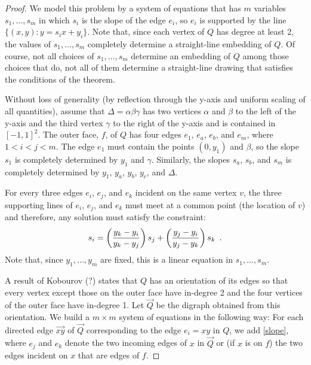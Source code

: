\documentclass{patmorin}
\begin{document}
\begin{proof}
   We model this problem by a system of equations that has $m$
   variables $s_1,\ldots,s_m$ in which $s_i$ is the slope of the edge
   $e_i$, so $e_i$ is supported by the line $\{(x,y):y=s_ix + y_i\}$.
   Note that, since each vertex of $Q$ has degree at least 2, the values
   of $s_1,\ldots,s_m$ completely determine a straight-line embedding
   of $Q$.  Of course, not all choices of $s_1,\ldots,s_m$ determine an
   embedding of $Q$ among those choices that do, not all of them determine
   a straight-line drawing that satisfies the conditions of the theorem.

   Without loss of generality (by reflection through the
   y-axis and uniform scaling of all quantities), assume that
   $\Delta=\alpha\beta\gamma$ has two vertices $\alpha$ and $\beta$
   to the left of the y-axis and the third vertex $\gamma$ to the right
   of the y-axis and is contained in $[-1,1]^2$.  The outer face, $f$,
   of $Q$ has four edges $e_1$, $e_a$, $e_b$, and $e_m$, where $1 < i <
   j < m$.  The edge $e_1$ must contain the points $(0,y_1)$ and $\beta$,
   so the slope $s_1$ is completely determined by $y_1$ and $\gamma$.
   Similarly, the slopes $s_a$, $s_b$, and $s_m$ is completely determined
   by $y_1$, $y_a$, $y_b$, $y_c$, and $\Delta$.


   For every three edges $e_i$, $e_j$, and $e_k$ incident on the same
   vertex $v$, the three supporting lines of $e_i$, $e_j$, and $e_k$
   must meet at a common point (the location of $v$) and therefore,
   any solution must satisfy the constraint:
   \begin{equation}\eqlabel{slope} 
       s_i = \left(\frac{y_k-y_i}{y_k-y_j}\right) s_j + \left(\frac{y_j-y_i}{y_j-y_k}\right)s_k \enspace .
   \end{equation}
   Note that, since $y_1,\ldots,y_m$ are fixed, this is a linear equation
   in $s_1,\ldots,s_m$.

   A result of Kobourov (?) states that $Q$ has an orientation of
   its edges so that every vertex except those on the outer face have
   in-degree 2 and the four vertices of the outer face have in-degree 1.
   Let $\vec{Q}$ be the digraph obtained from this orientation. We
   build a $m\times m$ system of equations in the following way: For
   each directed edge $\vec{xy}$ of $\vec{Q}$ corresponding to the edge
   $e_i=xy$ in $Q$, we add \eqref{slope}, where $e_j$ and $e_k$ denote
   the two incoming edges of $x$ in $\vec{Q}$ or (if $x$ is on $f$)
   the two edges incident on $x$ that are edges of $f$.


\end{proof}
\end{document}
